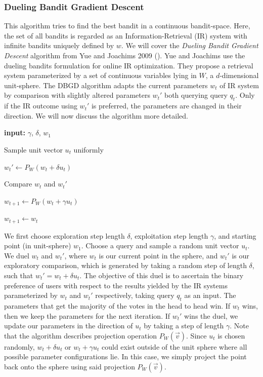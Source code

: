 \documentclass[
  letterpaper,
  numbers=noenddot,
  DIV=11]{scrreprt}
\theoremstyle{plain}
\theoremstyle{definition}
\theoremstyle{remark}
\begin{document}
\subsubsection{Dueling Bandit Gradient
Descent}\label{dueling-bandit-gradient-descent}

This algorithm tries to find the best bandit in a continuous
bandit-space. Here, the set of all bandits is regarded as an
Information-Retrieval (IR) system with infinite bandits uniquely defined
by \(w\). We will cover the \emph{Dueling Bandit Gradient Descent}
algorithm from Yue and Joachims 2009 (). Yue and Joachims use the dueling bandits formulation for online
IR optimization. They propose a retrieval system parameterized by a set
of continuous variables lying in \(W\), a \(d\)-dimensional unit-sphere.
The DBGD algorithm adapts the current parameters \(w_t\) of IR system by
comparison with slightly altered parameters \(w_t'\) both querying query
\(q_t\). Only if the IR outcome using \(w_t'\) is preferred, the
parameters are changed in their direction. We will now discuss the
algorithm more detailed.

\textbf{input:} \(\gamma\), \(\delta\), \(w_1\)

Sample unit vector \(u_t\) uniformly

\(w_t' \gets P_W(w_t + \delta u_t)\)

Compare \(w_t\) and \(w_t'\)

\(w_{t+1} \gets P_W(w_t + \gamma u_t)\)

\(w_{t+1} \gets w_t\)

We first choose exploration step length \(\delta\), exploitation step
length \(\gamma\), and starting point (in unit-sphere) \(w_1\). Choose a
query and sample a random unit vector \(u_t\). We duel \(w_t\) and
\(w_t'\), where \(w_t\) is our current point in the sphere, and \(w_t'\)
is our exploratory comparison, which is generated by taking a random
step of length \(\delta\), such that \(w_t' = w_t + \delta u_t\). The
objective of this duel is to ascertain the binary preference of users
with respect to the results yielded by the IR systems parameterized by
\(w_t\) and \(w_t'\) respectively, taking query \(q_t\) as an input. The
parameters that get the majority of the votes in the head to head win.
If \(w_t\) wins, then we keep the parameters for the next iteration. If
\(w_t'\) wins the duel, we update our parameters in the direction of
\(u_t\) by taking a step of length \(\gamma\). Note that the algorithm
describes projection operation \(P_W(\overrightarrow{v})\). Since
\(u_t\) is chosen randomly, \(w_t + \delta u_t\) or \(w_t + \gamma u_t\)
could exist outside of the unit sphere where all possible parameter
configurations lie. In this case, we simply project the point back onto
the sphere using said projection \(P_W(\overrightarrow{v})\).
\end{document}
